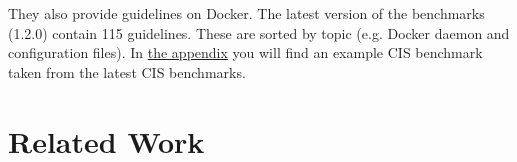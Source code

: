 \hfill

They also provide guidelines on Docker\cite{cis}. The latest version of the benchmarks (1.2.0) contain 115 guidelines. These are sorted by topic (e.g. Docker daemon and configuration files). In \hyperref[appendix:a]{the appendix} you will find an example CIS benchmark taken from the latest CIS benchmarks.

\section{Related Work}
